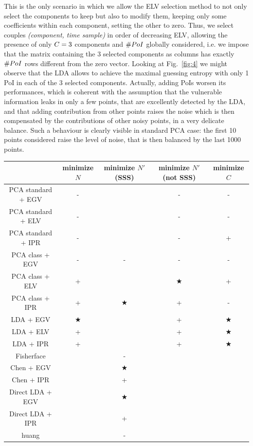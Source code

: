 This is the only scenario in which we allow the ELV selection method to not only select the components to keep but also to modify them, keeping only some coefficients within each component, setting the other to zero. Thus, we select couples \textit{(component, time sample)} in order of decreasing ELV, allowing the presence of only $C = 3$ components and $\# PoI$ globally considered, {i.e.} we impose that the matrix containing the 3 selected components as columns has exactly $\# PoI$ rows different from the zero vector. 
Looking at Fig.~\ref{fig:4} we might observe that the LDA allows to achieve the maximal guessing entropy with only 1 PoI in each of the 3 selected components. 
Actually, adding PoIs worsen its performances, which is coherent with the assumption that the vulnerable information leaks in only a few points, that are excellently detected by the LDA, and that adding contribution from other points raises the noise which is then compensated by the contributions of other noisy points, in a very delicate balance. Such a behaviour is clearly visible in standard PCA case: the first 10 points considered raise the level of noise, that is then balanced by the last 1000 points.

\begin{center}
\begin{tiny}
\begin{tabular}{|c|c|c|c|c|}
\hline
& minimize $N$ & minimize $N'$ (SSS) & minimize $N'$ (not SSS) & minimize $C$ \\
\hline
PCA standard + EGV & - &  &- &- \\
\hline
\rowcolor[gray]{0.8}  PCA standard + ELV & - & &- &- \\
\hline
PCA standard + IPR &- & &- &+ \\
\hline
PCA class + EGV & - &- &- &- \\
\hline
\rowcolor[gray]{0.8} PCA class + ELV &+ & &$\bigstar$ & + \\
\hline 
PCA class + IPR & + &$\bigstar$ &+ &- \\
\hline 
LDA + EGV &$\bigstar$ & & + & $\bigstar$\\
\hline 
\rowcolor[gray]{0.8} LDA + ELV & + &  & + & $\bigstar$\\
\hline 
LDA + IPR & + & &+ & $\bigstar$ \\
\hline 
\rowcolor[gray]{0.8} Fisherface & &- & & \\
\hline 
\rowcolor[gray]{0.8} Chen + EGV & &$\bigstar$ & & \\
\hline 
\rowcolor[gray]{0.8} Chen + IPR & &+ & & \\
\hline 
\rowcolor[gray]{0.8} Direct LDA + EGV & & $\bigstar$& & \\
\hline 
\rowcolor[gray]{0.8} Direct LDA + IPR & &+& & \\
\hline
\rowcolor[gray]{0.8} huang & &- & & \\
\hline
\end{tabular}
\end{tiny}
\end{center}